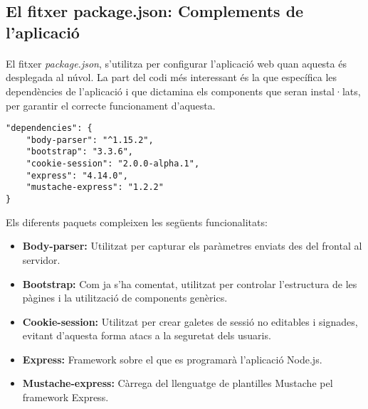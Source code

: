 \subsection{El fitxer package.json: Complements de l'aplicació}

    \paragraph{}
    El fitxer \emph{package.json}, s'utilitza per configurar l'aplicació web quan aquesta és desplegada al núvol. La part del codi més interessant és la que específica les dependències de l'aplicació i que dictamina els components que seran instal·lats, per garantir el correcte funcionament d'aquesta.

    \clearpage

    \begin{lstlisting}[style=rawOwn,caption={Dependències declarades en el fitxer pacakge.json}]
"dependencies": {
    "body-parser": "^1.15.2",
    "bootstrap": "3.3.6",
    "cookie-session": "2.0.0-alpha.1",
    "express": "4.14.0",
    "mustache-express": "1.2.2"
}
    \end{lstlisting}

    Els diferents paquets compleixen les següents funcionalitats:

    \begin{itemize}
        \item \textbf{Body-parser:} Utilitzat per capturar els paràmetres enviats des del frontal al servidor.
        \item \textbf{Bootstrap:} Com ja s'ha comentat, utilitzat per controlar l'estructura de les pàgines i la utilització de components genèrics.
        \item \textbf{Cookie-session:} Utilitzat per crear galetes de sessió no editables i signades, evitant d'aquesta forma atacs a la seguretat dels usuaris.
        \item \textbf{Express:} Framework sobre el que es programarà l'aplicació Node.js.
        \item \textbf{Mustache-express:} Càrrega del llenguatge de plantilles Mustache pel framework Express.
    \end{itemize}
